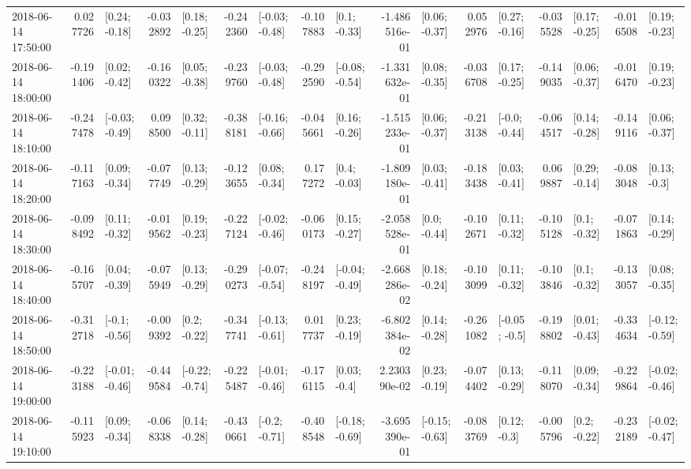 \begin{tabular}{lrlrlrlrlrlrlrlrl}
2018-06-14 17:50:00 &  0.027726 &   [0.24; -0.18] & -0.032892 &   [0.18; -0.25] & -0.242360 &  [-0.03; -0.48] & -0.107883 &    [0.1; -0.33] & -1.486516e-01 &   [0.06; -0.37] &  0.052976 &   [0.27; -0.16] & -0.035528 &   [0.17; -0.25] & -0.016508 &   [0.19; -0.23] \\
2018-06-14 18:00:00 & -0.191406 &   [0.02; -0.42] & -0.160322 &   [0.05; -0.38] & -0.239760 &  [-0.03; -0.48] & -0.292590 &  [-0.08; -0.54] & -1.331632e-01 &   [0.08; -0.35] & -0.036708 &   [0.17; -0.25] & -0.149035 &   [0.06; -0.37] & -0.016470 &   [0.19; -0.23] \\
2018-06-14 18:10:00 & -0.247478 &  [-0.03; -0.49] &  0.098500 &   [0.32; -0.11] & -0.388181 &  [-0.16; -0.66] & -0.045661 &   [0.16; -0.26] & -1.515233e-01 &   [0.06; -0.37] & -0.213138 &   [-0.0; -0.44] & -0.064517 &   [0.14; -0.28] & -0.149116 &   [0.06; -0.37] \\
2018-06-14 18:20:00 & -0.117163 &   [0.09; -0.34] & -0.077749 &   [0.13; -0.29] & -0.123655 &   [0.08; -0.34] &  0.177272 &    [0.4; -0.03] & -1.809180e-01 &   [0.03; -0.41] & -0.183438 &   [0.03; -0.41] &  0.069887 &   [0.29; -0.14] & -0.083048 &    [0.13; -0.3] \\
2018-06-14 18:30:00 & -0.098492 &   [0.11; -0.32] & -0.019562 &   [0.19; -0.23] & -0.227124 &  [-0.02; -0.46] & -0.060173 &   [0.15; -0.27] & -2.058528e-01 &    [0.0; -0.44] & -0.102671 &   [0.11; -0.32] & -0.105128 &    [0.1; -0.32] & -0.071863 &   [0.14; -0.29] \\
2018-06-14 18:40:00 & -0.165707 &   [0.04; -0.39] & -0.075949 &   [0.13; -0.29] & -0.290273 &  [-0.07; -0.54] & -0.248197 &  [-0.04; -0.49] & -2.668286e-02 &   [0.18; -0.24] & -0.103099 &   [0.11; -0.32] & -0.103846 &    [0.1; -0.32] & -0.133057 &   [0.08; -0.35] \\
2018-06-14 18:50:00 & -0.312718 &   [-0.1; -0.56] & -0.009392 &    [0.2; -0.22] & -0.347741 &  [-0.13; -0.61] &  0.017737 &   [0.23; -0.19] & -6.802384e-02 &   [0.14; -0.28] & -0.261082 &   [-0.05; -0.5] & -0.198802 &   [0.01; -0.43] & -0.334634 &  [-0.12; -0.59] \\
2018-06-14 19:00:00 & -0.223188 &  [-0.01; -0.46] & -0.449584 &  [-0.22; -0.74] & -0.225487 &  [-0.01; -0.46] & -0.176115 &    [0.03; -0.4] &  2.230390e-02 &   [0.23; -0.19] & -0.074402 &   [0.13; -0.29] & -0.118070 &   [0.09; -0.34] & -0.229864 &  [-0.02; -0.46] \\
2018-06-14 19:10:00 & -0.115923 &   [0.09; -0.34] & -0.068338 &   [0.14; -0.28] & -0.430661 &   [-0.2; -0.71] & -0.408548 &  [-0.18; -0.69] & -3.695390e-01 &  [-0.15; -0.63] & -0.083769 &    [0.12; -0.3] & -0.005796 &    [0.2; -0.22] & -0.232189 &  [-0.02; -0.47] \\

\end{tabular}
